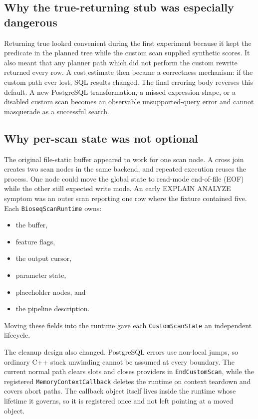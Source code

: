 \subsection{Why the true-returning stub was especially dangerous}

Returning true looked convenient during the first experiment because it kept
the predicate in the planned tree while the custom scan supplied synthetic
scores.  It also meant that any planner path which did not perform the custom
rewrite returned every row.  A cost estimate then became a correctness
mechanism: if the custom path ever lost, SQL results changed.  The final
erroring body reverses this default.  A new PostgreSQL transformation, a
missed expression shape, or a disabled custom scan becomes an observable
unsupported-query error and cannot masquerade as a successful search.

\subsection{Why per-scan state was not optional}

The original file-static buffer appeared to work for one scan node.  A cross
join creates two scan nodes in the same backend, and repeated execution reuses
the process.  One node could move the global state to read-mode end-of-file
(EOF) while the
other still expected write mode.  An early EXPLAIN ANALYZE symptom was an
outer scan reporting one row where the fixture contained five.  Each
\texttt{BioseqScanRuntime} owns:
\begin{itemize}
  \setlength{\itemsep}{0pt}
  \setlength{\parsep}{0pt}
  \item the buffer,
  \item feature flags,
  \item the output cursor,
  \item parameter state,
  \item placeholder nodes, and
  \item the pipeline description.
\end{itemize}
Moving these fields into the runtime gave each \texttt{CustomScanState} an
independent lifecycle.

The cleanup design also changed.  PostgreSQL errors use non-local jumps, so
ordinary C++ stack unwinding cannot be assumed at every boundary.  The
current normal path clears slots and closes providers in
\texttt{EndCustomScan}, while the registered \texttt{MemoryContextCallback}
deletes the runtime on context teardown and covers abort paths.  The callback
object itself lives inside the runtime whose lifetime it governs, so it is
registered once and not left pointing at a moved object.

